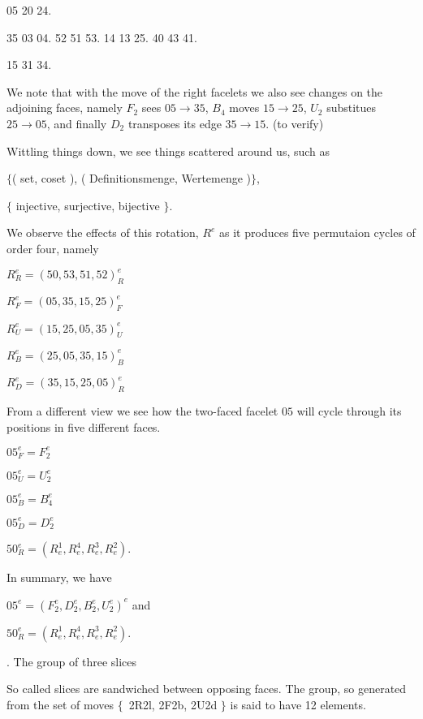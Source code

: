 {{\smallskip
{} 05 20 24.\par\thinspace
{} 35 03 04.\qquad{} 52 51 53.\qquad
{} 14 13 25.\qquad{} 40 43 41.\par\thinspace
{} 15 31 34.

\smallskip
We note that with the move of the right facelets we
also see changes on the adjoining faces, namely
$F_2$ sees $05\to 35$, $B_4$ moves $15\to 25$,
$U_2$ substitues $25\to 05$, and finally $D_2$
transposes its edge $35\to 15$. (to verify)

\smallskip
Wittling things down, we see things scattered around us,
such as

\e$\{$( set, coset ), ( Definitionsmenge, Wertemenge )$\}$,

$\{$ injective, surjective, bijective $\}$.

\vfil\eject
We observe the effects of this rotation, $R^e$ as it
produces five permutaion cycles of order four, namely

\smallskip
$R_R^e=(50, 53, 51, 52)_R^e$

$R_F^e=(05, 35, 15, 25)_F^e$

$R_U^e=(15, 25, 05, 35)_U^e$

$R_B^e=(25, 05, 35, 15)_B^e$

$R_D^e=(35, 15, 25, 05)_R^e$

\e
From a different view we see how the two-faced facelet $05$
will cycle through its positions in five
different faces.

\smallskip$05_F^e=F_2^e$

$05_U^e=U_2^e$

$05_B^e=B_4^e$

$05_D^e=D_2^e$

$50_R^e=(R_e^1, R_e^4, R_e^3, R_e^2)$.


\e In summary, we have

$05^e=(F_2^e, D_2^e, B_2^e, U_2^e)^e$ and

$50_R^e=(R_e^1, R_e^4, R_e^3, R_e^2)$.
}%
\hfil\eject
{}. The group of three slices

So called slices are sandwiched between opposing faces.
The group, so generated from the set of moves\break
$\{$~2R2l, 2F2b, 2U2d $\}$
is said to have 12 elements\gg.

}
